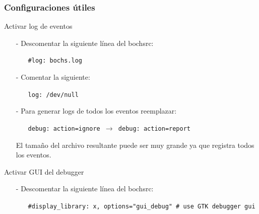 \documentclass[aspectratio=169]{beamer}
\begin{document}
\begin{frame}[fragile]
\frametitle{Configuraciones útiles}
    \textcolor{naranjauca}{Activar log de eventos}\\
    \begin{itemize}
    \item[-] Descomentar la siguiente línea del bochsrc:\\
    \begin{itemize}
    \item[] \small \texttt{\#log: bochs.log}
    \end{itemize}
    \item[-] Comentar la siguiente: \\
    \begin{itemize}
    \item[] \small \texttt{log: /dev/null}
    \end{itemize}
    \item[-] Para generar logs de todos los eventos reemplazar:\\
    \begin{itemize}
    \item[] \small \texttt{debug: action=ignore $\longrightarrow$ debug: action=report}
    \end{itemize}
    \small El tamaño del archivo resultante puede ser muy grande ya que registra todos los eventos.
    \end{itemize}
    \vspace{0.2cm}
    \pause
    \textcolor{naranjauca}{Activar GUI del debugger}\\
    \begin{itemize}
    \item[-] Descomentar la siguiente línea del bochsrc: \\
    \begin{itemize}
    \item[] \small \texttt{\#display\_library: x, options="gui\_debug" \# use GTK debugger gui}
    \end{itemize}
    \end{itemize}
\end{frame}
\end{document}
